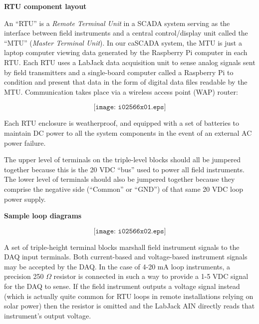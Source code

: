 

\noindent
{\bf RTU component layout}

\vskip 10pt

An ``RTU'' is a {\it Remote Terminal Unit} in a SCADA system serving as the interface between field instruments and a central control/display unit called the ``MTU'' ({\it Master Terminal Unit}).  In our caSCADA system, the MTU is just a laptop computer viewing data generated by the Raspberry Pi computer in each RTU.  Each RTU uses a LabJack data acquisition unit to sense analog signals sent by field transmitters and a single-board computer called a Raspberry Pi to condition and present that data in the form of digital data files readable by the MTU.  Communication takes place via a wireless access point (WAP) router:

$$\texttt{[image: i02566x01.eps]}$$

Each RTU enclosure is weatherproof, and equipped with a set of batteries to maintain DC power to all the system components in the event of an external AC power failure.

The upper level of terminals on the triple-level blocks should all be jumpered together because this is the 20 VDC ``bus'' used to power all field instruments.  The lower level of terminals should also be jumpered together because they comprise the negative side (``Common'' or ``GND'') of that same 20 VDC loop power supply.





\vfil \eject

\noindent
{\bf Sample loop diagrams}

$$\texttt{[image: i02566x02.eps]}$$

A set of triple-height terminal blocks marshall field instrument signals to the DAQ input terminals.  Both current-based and voltage-based instrument signals may be accepted by the DAQ.  In the case of 4-20 mA loop instruments, a precision 250 $\Omega$ resistor is connected in such a way to provide a 1-5 VDC signal for the DAQ to sense.  If the field instrument outputs a voltage signal instead (which is actually quite common for RTU loops in remote installations relying on solar power) then the resistor is omitted and the LabJack AIN directly reads that instrument's output voltage.

